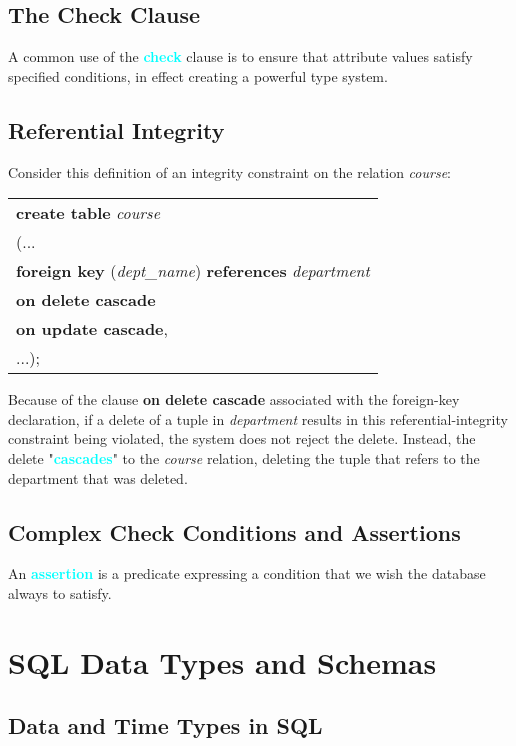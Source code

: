 \documentclass[a4paper,12pt,twoside,openany]{book}
\newcommand{\textcy}[1]{\textbf{\textcolor{cyan}{#1}}}
\begin{document}
\subsection{The Check Clause}

A common use of the \textcy{check} clause is to ensure that attribute values satisfy specified conditions, in effect creating a powerful type system.

\subsection{Referential Integrity}

Consider this definition of an integrity constraint on the relation \textit{course}:
\begin{center}
    \begin{tabular}{l}
        \textbf{create table} \textit{course}\\
        \qquad (...\\
        \qquad \textbf{foreign key} (\textit{dept\_name}) \textbf{references} \textit{department}\\
        \qquad\qquad \textbf{on delete cascade}\\
        \qquad\qquad \textbf{on update cascade},\\
        \qquad ...);
    \end{tabular}
\end{center}
Because of the clause \textbf{on delete cascade} associated with the foreign-key declaration, if a delete of a tuple in \textit{department} results in this referential-integrity constraint being violated, the system does not reject the delete. Instead, the delete "\textcy{cascades}" to the \textit{course} relation, deleting the tuple that refers to the department that was deleted.

\subsection{Complex Check Conditions and Assertions}

An \textcy{assertion} is a predicate expressing a condition that we wish the database always to satisfy.

\section{SQL Data Types and Schemas}
\subsection{Data and Time Types in SQL}
\end{document}

